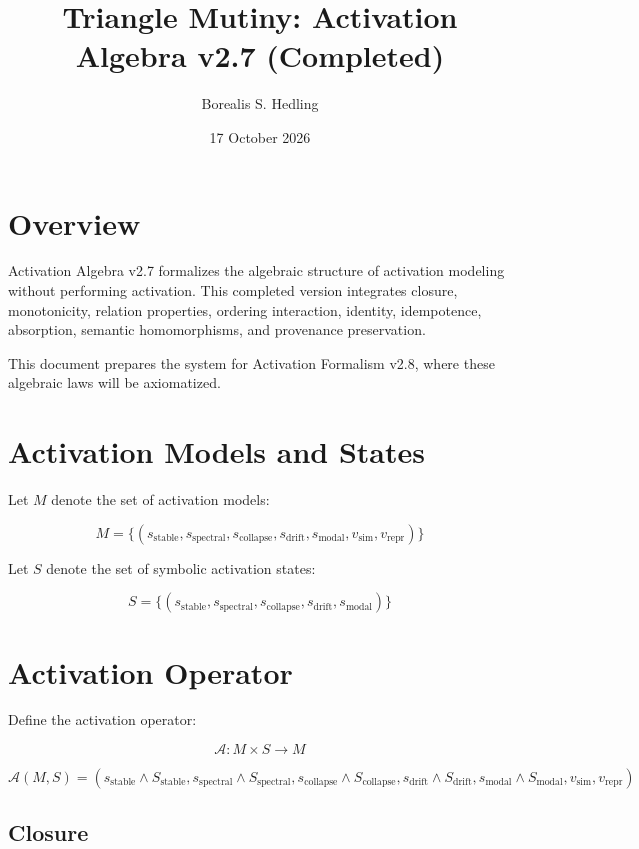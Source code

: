 \documentclass[11pt]{article}
\title{Triangle Mutiny: Activation Algebra v2.7 (Completed)}
\author{Borealis S. Hedling}
\date{17 October 2026}
\begin{document}
\maketitle

\section*{Overview}

Activation Algebra v2.7 formalizes the algebraic structure of activation
modeling without performing activation. This completed version integrates
closure, monotonicity, relation properties, ordering interaction, identity,
idempotence, absorption, semantic homomorphisms, and provenance preservation.

This document prepares the system for Activation Formalism v2.8, where these
algebraic laws will be axiomatized.

\section*{Activation Models and States}

Let $M$ denote the set of activation models:

\[
M = \{ (s_{\text{stable}}, s_{\text{spectral}}, s_{\text{collapse}},
        s_{\text{drift}}, s_{\text{modal}},
        v_{\text{sim}}, v_{\text{repr}} ) \}
\]

Let $S$ denote the set of symbolic activation states:

\[
S = \{ (s_{\text{stable}}, s_{\text{spectral}}, s_{\text{collapse}},
        s_{\text{drift}}, s_{\text{modal}} ) \}
\]

\section*{Activation Operator}

Define the activation operator:

\[
\mathcal{A} : M \times S \to M
\]

\[
\mathcal{A}(M, S) =
  (s_{\text{stable}} \land S_{\text{stable}},
   s_{\text{spectral}} \land S_{\text{spectral}},
   s_{\text{collapse}} \land S_{\text{collapse}},
   s_{\text{drift}} \land S_{\text{drift}},
   s_{\text{modal}} \land S_{\text{modal}},
   v_{\text{sim}}, v_{\text{repr}})
\]

\subsection*{Closure}
\end{document}
